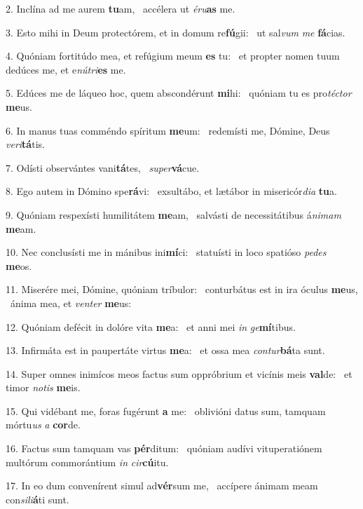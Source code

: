 2. Inclína ad me aurem \textbf{tu}am, \ast\  accélera ut \textit{é}\textit{ru}\textbf{as} me.\

3. Esto mihi in Deum protectórem, et in domum re\textbf{fú}gii: \ast\  ut sal\textit{vum} \textit{me} \textbf{fá}cias.\

4. Quóniam fortitúdo mea, et refúgium meum \textbf{es} tu: \ast\  et propter nomen tuum dedúces me, et e\textit{nú}\textit{tri}\textbf{es} me.\

5. Edúces me de láqueo hoc, quem abscondérunt \textbf{mi}hi: \ast\  quóniam tu es pro\textit{téc}\textit{tor} \textbf{me}us.\

6. In manus tuas comméndo spíritum \textbf{me}um: \ast\  redemísti me, Dómine, Deus \textit{ve}\textit{ri}\textbf{tá}tis.\

7. Odísti observántes vani\textbf{tá}tes, \ast\  \textit{su}\textit{per}\textbf{vá}cue.\

8. Ego autem in Dómino spe\textbf{rá}vi: \ast\  exsultábo, et lætábor in misericór\textit{di}\textit{a} \textbf{tu}a.\

9. Quóniam respexísti humilitátem \textbf{me}am, \ast\  salvásti de necessitátibus á\textit{ni}\textit{mam} \textbf{me}am.\

10. Nec conclusísti me in mánibus ini\textbf{mí}ci: \ast\  statuísti in loco spatióso \textit{pe}\textit{des} \textbf{me}os.\

11. Miserére mei, Dómine, quóniam tríbulor: \dag\  conturbátus est in ira óculus \textbf{me}us, \ast\  ánima mea, et \textit{ven}\textit{ter} \textbf{me}us:\

12. Quóniam defécit in dolóre vita \textbf{me}a: \ast\  et anni mei \textit{in} \textit{ge}\textbf{mí}tibus.\

13. Infirmáta est in paupertáte virtus \textbf{me}a: \ast\  et ossa mea \textit{con}\textit{tur}\textbf{bá}ta sunt.\

14. Super omnes inimícos meos factus sum oppróbrium et vicínis meis \textbf{val}de: \ast\  et timor \textit{no}\textit{tis} \textbf{me}is.\

15. Qui vidébant me, foras fugérunt \textbf{a} me: \ast\  oblivióni datus sum, tamquam mórtu\textit{us} \textit{a} \textbf{cor}de.\

16. Factus sum tamquam vas \textbf{pér}ditum: \ast\  quóniam audívi vituperatiónem multórum commorántium \textit{in} \textit{cir}\textbf{cú}itu.\

17. In eo dum convenírent simul ad\textbf{vér}sum me, \ast\  accípere ánimam meam con\textit{si}\textit{li}\textbf{á}ti sunt.\

